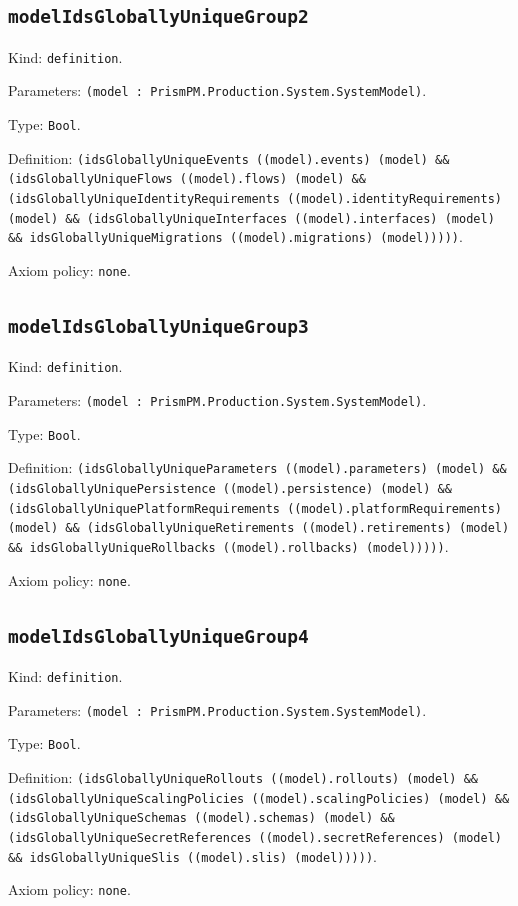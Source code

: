 \documentclass[11pt]{article}
\begin{document}
\subsection*{\texttt{modelIdsGloballyUniqueGroup2}}
\noindent Kind: \texttt{definition}.\par
\noindent Parameters: \texttt{(model : PrismPM.Production.System.SystemModel)}.\par
\noindent Type: \texttt{Bool}.\par
\noindent Definition: \texttt{(idsGloballyUniqueEvents ((model).events) (model) \&\& (idsGloballyUniqueFlows ((model).flows) (model) \&\& (idsGloballyUniqueIdentityRequirements ((model).identityRequirements) (model) \&\& (idsGloballyUniqueInterfaces ((model).interfaces) (model) \&\& idsGloballyUniqueMigrations ((model).migrations) (model)))))}.\par
\noindent Axiom policy: \texttt{none}.\par
\subsection*{\texttt{modelIdsGloballyUniqueGroup3}}
\noindent Kind: \texttt{definition}.\par
\noindent Parameters: \texttt{(model : PrismPM.Production.System.SystemModel)}.\par
\noindent Type: \texttt{Bool}.\par
\noindent Definition: \texttt{(idsGloballyUniqueParameters ((model).parameters) (model) \&\& (idsGloballyUniquePersistence ((model).persistence) (model) \&\& (idsGloballyUniquePlatformRequirements ((model).platformRequirements) (model) \&\& (idsGloballyUniqueRetirements ((model).retirements) (model) \&\& idsGloballyUniqueRollbacks ((model).rollbacks) (model)))))}.\par
\noindent Axiom policy: \texttt{none}.\par
\subsection*{\texttt{modelIdsGloballyUniqueGroup4}}
\noindent Kind: \texttt{definition}.\par
\noindent Parameters: \texttt{(model : PrismPM.Production.System.SystemModel)}.\par
\noindent Type: \texttt{Bool}.\par
\noindent Definition: \texttt{(idsGloballyUniqueRollouts ((model).rollouts) (model) \&\& (idsGloballyUniqueScalingPolicies ((model).scalingPolicies) (model) \&\& (idsGloballyUniqueSchemas ((model).schemas) (model) \&\& (idsGloballyUniqueSecretReferences ((model).secretReferences) (model) \&\& idsGloballyUniqueSlis ((model).slis) (model)))))}.\par
\noindent Axiom policy: \texttt{none}.\par
\end{document}
